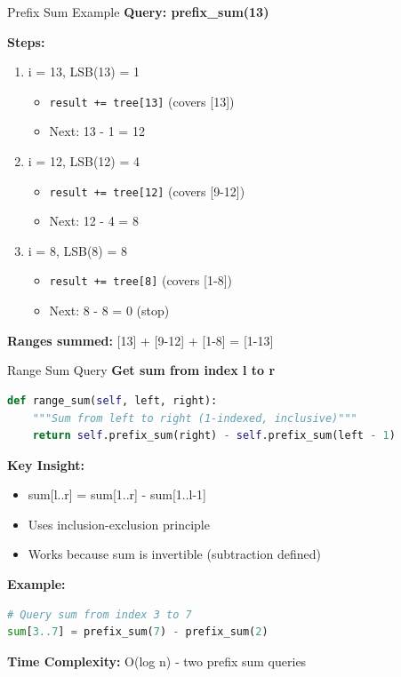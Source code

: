 \documentclass[aspectratio=169]{beamer}
\begin{document}
\begin{frame}{Prefix Sum Example}
  \textbf{Query: prefix\_sum(13)}

  \vspace{0.3cm}
  \textbf{Steps:}
  \begin{enumerate}
    \item i = 13, LSB(13) = 1
      \begin{itemize}
        \item \texttt{result += tree[13]} (covers [13])
        \item Next: 13 - 1 = 12
      \end{itemize}
    \item i = 12, LSB(12) = 4
      \begin{itemize}
        \item \texttt{result += tree[12]} (covers [9-12])
        \item Next: 12 - 4 = 8
      \end{itemize}
    \item i = 8, LSB(8) = 8
      \begin{itemize}
        \item \texttt{result += tree[8]} (covers [1-8])
        \item Next: 8 - 8 = 0 (stop)
      \end{itemize}
  \end{enumerate}

  \vspace{0.5cm}
  \textbf{Ranges summed:} [13] + [9-12] + [1-8] = [1-13] \checkmark
\end{frame}

\begin{frame}[fragile]{Range Sum Query}
  \textbf{Get sum from index l to r}

  \begin{lstlisting}[language=Python, basicstyle=\ttfamily\footnotesize]
def range_sum(self, left, right):
    """Sum from left to right (1-indexed, inclusive)"""
    return self.prefix_sum(right) - self.prefix_sum(left - 1)
  \end{lstlisting}

  \vspace{0.5cm}
  \textbf{Key Insight:}
  \begin{itemize}
    \item sum[l..r] = sum[1..r] - sum[1..l-1]
    \item Uses inclusion-exclusion principle
    \item Works because sum is invertible (subtraction defined)
  \end{itemize}

  \vspace{0.5cm}
  \textbf{Example:}
  \begin{lstlisting}[language=Python, basicstyle=\ttfamily\footnotesize]
# Query sum from index 3 to 7
sum[3..7] = prefix_sum(7) - prefix_sum(2)
  \end{lstlisting}

  \vspace{0.3cm}
  \textbf{Time Complexity:} O(log n) - two prefix sum queries
\end{frame}
\end{document}
